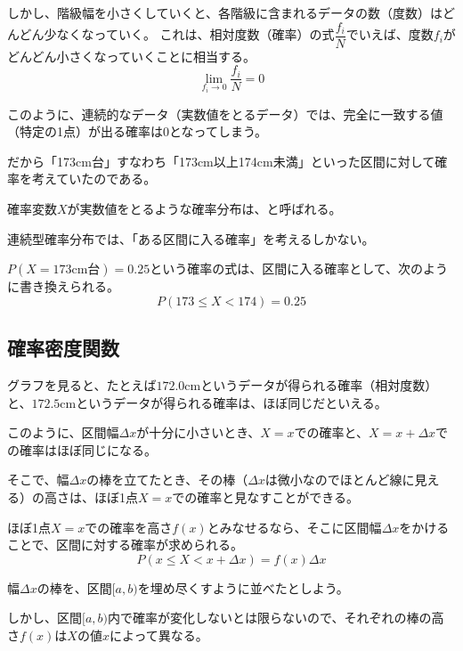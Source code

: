 \documentclass[../../../topic_statistics]{subfiles}
\begin{document}
しかし、階級幅を小さくしていくと、各階級に含まれるデータの数（度数）はどんどん少なくなっていく。
これは、相対度数（確率）の式$\dfrac{f_i}{N}$でいえば、度数$f_i$がどんどん小さくなっていくことに相当する。
\begin{equation*}
  \lim_{f_i \to 0} \frac{f_i}{N} = 0
\end{equation*}

このように、連続的なデータ（実数値をとるデータ）では、完全に一致する値（特定の1点）が出る確率は$0$となってしまう。

だから「173cm台」すなわち「173cm以上174cm未満」といった区間に対して確率を考えていたのである。

\br

確率変数$X$が実数値をとるような確率分布は、と呼ばれる。

連続型確率分布では、「ある区間に入る確率」を考えるしかない。

\br

$P(X = 173\text{cm台}) = 0.25$という確率の式は、区間に入る確率として、次のように書き換えられる。
\begin{equation*}
  P(173 \leq X < 174) = 0.25
\end{equation*}

\subsection{確率密度関数}

グラフを見ると、たとえば$172.0$cmというデータが得られる確率（相対度数）と、$172.5$cmというデータが得られる確率は、ほぼ同じだといえる。

\br

このように、区間幅$\Delta x$が十分に小さいとき、$X = x$での確率と、$X = x + \Delta x$での確率はほぼ同じになる。

そこで、幅$\Delta x$の棒を立てたとき、その棒（$\Delta x$は微小なのでほとんど線に見える）の高さは、ほぼ1点$X = x$での確率と見なすことができる。

\br

ほぼ1点$X = x$での確率を高さ$f(x)$とみなせるなら、そこに区間幅$\Delta x$をかけることで、区間に対する確率が求められる。
\begin{equation*}
  P(x \leq X < x + \Delta x) = f(x) \Delta x
\end{equation*}

\br

幅$\Delta x$の棒を、区間$[a, b)$を埋め尽くすように並べたとしよう。

しかし、区間$[a, b)$内で確率が変化しないとは限らないので、それぞれの棒の高さ$f(x)$は$X$の値$x$によって異なる。
\end{document}
